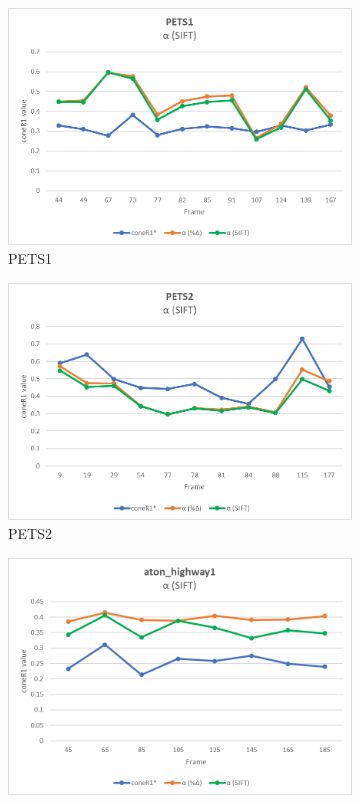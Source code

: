 \begin{appendices}
\begin{figure}
  \begin{subfigure}{.45\linewidth}
  \includegraphics[width=1\linewidth]{figures/appendix/pets1_sift.jpg}
  \caption{PETS1}
\end{subfigure}
\hfill
\begin{subfigure}{.45\linewidth}
  \includegraphics[width=1\linewidth]{figures/appendix/pets2_sift.jpg}
  \caption{PETS2}
\end{subfigure}
\hfill
\begin{subfigure}{.45\linewidth}
  \includegraphics[width=1\linewidth]{figures/appendix/highway1_sift.jpg}

\end{subfigure}
\end{figure}
\end{appendices}
